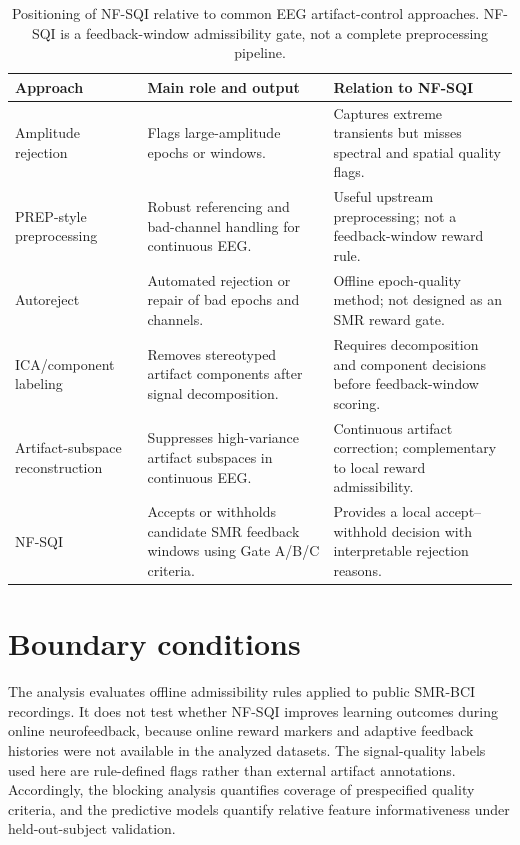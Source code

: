 \documentclass[preprint,12pt]{elsarticle}
\begin{document}
\begin{table}[!htbp]
\centering
\scriptsize
\setlength{\tabcolsep}{3.5pt}
\renewcommand{\arraystretch}{0.92}
\caption{Positioning of NF-SQI relative to common EEG artifact-control approaches. NF-SQI is a feedback-window admissibility gate, not a complete preprocessing pipeline.}
\label{tab:related_methods}
\begin{tabularx}{\textwidth}{@{}
>{\raggedright\arraybackslash}p{}
>{\raggedright\arraybackslash}X
>{\raggedright\arraybackslash}X
@{}}
\toprule
Approach & Main role and output & Relation to NF-SQI \\
\midrule
Amplitude rejection &
Flags large-amplitude epochs or windows. &
Captures extreme transients but misses spectral and spatial quality flags. \\

PREP-style preprocessing &
Robust referencing and bad-channel handling for continuous EEG. &
Useful upstream preprocessing; not a feedback-window reward rule. \\

Autoreject &
Automated rejection or repair of bad epochs and channels. &
Offline epoch-quality method; not designed as an SMR reward gate. \\

ICA/component labeling &
Removes stereotyped artifact components after signal decomposition. &
Requires decomposition and component decisions before feedback-window scoring. \\

Artifact-subspace reconstruction &
Suppresses high-variance artifact subspaces in continuous EEG. &
Continuous artifact correction; complementary to local reward admissibility. \\

NF-SQI &
Accepts or withholds candidate SMR feedback windows using Gate A/B/C criteria. &
Provides a local accept--withhold decision with interpretable rejection reasons. \\
\bottomrule
\end{tabularx}
\end{table}
\FloatBarrier

\section{Boundary conditions}

The analysis evaluates offline admissibility rules applied to public SMR-BCI recordings. It does not test whether NF-SQI improves learning outcomes during online neurofeedback, because online reward markers and adaptive feedback histories were not available in the analyzed datasets. The signal-quality labels used here are rule-defined flags rather than external artifact annotations. Accordingly, the blocking analysis quantifies coverage of prespecified quality criteria, and the predictive models quantify relative feature informativeness under held-out-subject validation.
\end{document}
